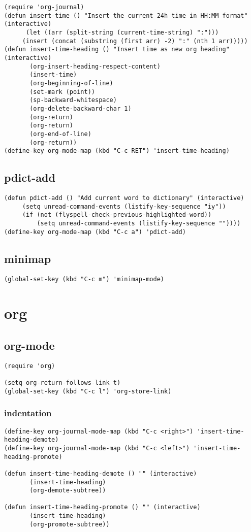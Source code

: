 \documentclass[11pt]{article}
\begin{document}
\begin{verbatim}
(require 'org-journal)
(defun insert-time () "Insert the current 24h time in HH:MM format" (interactive)
      (let ((arr (split-string (current-time-string) ":")))
	 (insert (concat (substring (first arr) -2) ":" (nth 1 arr)))))
(defun insert-time-heading () "Insert time as new org heading" (interactive)
       (org-insert-heading-respect-content)
       (insert-time)
       (org-beginning-of-line)
       (set-mark (point))
       (sp-backward-whitespace)
       (org-delete-backward-char 1)
       (org-return)
       (org-return)
       (org-end-of-line)
       (org-return))
(define-key org-mode-map (kbd "C-c RET") 'insert-time-heading)
\end{verbatim}


\subsection{pdict-add}
\label{sec:org57e1a7d}
\begin{verbatim}
(defun pdict-add () "Add current word to dictionary" (interactive)
	 (setq unread-command-events (listify-key-sequence "iy"))
	 (if (not (flyspell-check-previous-highlighted-word))
	     (setq unread-command-events (listify-key-sequence ""))))
(define-key org-mode-map (kbd "C-c a") 'pdict-add)
\end{verbatim}

\subsection{minimap}
\label{sec:org8c8489f}
\begin{verbatim}
(global-set-key (kbd "C-c m") 'minimap-mode)
\end{verbatim}

\section{org}
\label{sec:org5c59ae6}
\subsection{org-mode}
\label{sec:orgf9afa17}
\begin{verbatim}
(require 'org)

(setq org-return-follows-link t)
(global-set-key (kbd "C-c l") 'org-store-link)
\end{verbatim}

\subsubsection{indentation}
\label{sec:org8c2422c}
\begin{verbatim}
(define-key org-journal-mode-map (kbd "C-c <right>") 'insert-time-heading-demote)
(define-key org-journal-mode-map (kbd "C-c <left>") 'insert-time-heading-promote)

(defun insert-time-heading-demote () "" (interactive)
       (insert-time-heading)
       (org-demote-subtree))

(defun insert-time-heading-promote () "" (interactive)
       (insert-time-heading)
       (org-promote-subtree))
\end{verbatim}
\end{document}
